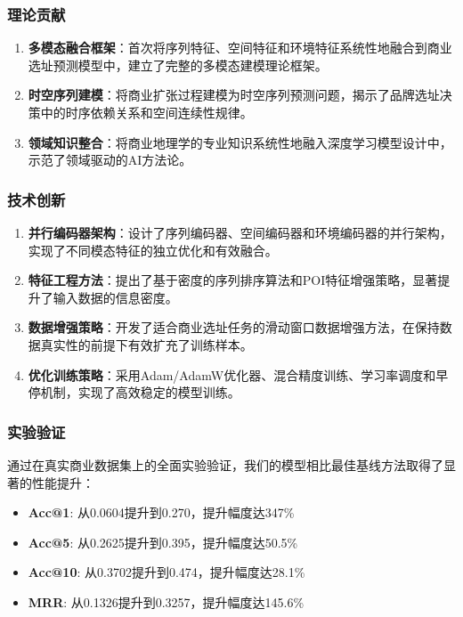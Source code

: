 \documentclass{article}
\begin{document}
\subsubsection{理论贡献}

\begin{enumerate}
\item \textbf{多模态融合框架}：首次将序列特征、空间特征和环境特征系统性地融合到商业选址预测模型中，建立了完整的多模态建模理论框架。
\item \textbf{时空序列建模}：将商业扩张过程建模为时空序列预测问题，揭示了品牌选址决策中的时序依赖关系和空间连续性规律。
\item \textbf{领域知识整合}：将商业地理学的专业知识系统性地融入深度学习模型设计中，示范了领域驱动的AI方法论。
\end{enumerate}

\subsubsection{技术创新}

\begin{enumerate}
\item \textbf{并行编码器架构}：设计了序列编码器、空间编码器和环境编码器的并行架构，实现了不同模态特征的独立优化和有效融合。
\item \textbf{特征工程方法}：提出了基于密度的序列排序算法和POI特征增强策略，显著提升了输入数据的信息密度。
\item \textbf{数据增强策略}：开发了适合商业选址任务的滑动窗口数据增强方法，在保持数据真实性的前提下有效扩充了训练样本。
\item \textbf{优化训练策略}：采用Adam/AdamW优化器、混合精度训练、学习率调度和早停机制，实现了高效稳定的模型训练。
\end{enumerate}

\subsubsection{实验验证}

通过在真实商业数据集上的全面实验验证，我们的模型相比最佳基线方法取得了显著的性能提升：

\begin{itemize}
\item \textbf{Acc@1}: 从0.0604提升到0.270，提升幅度达347\%
\item \textbf{Acc@5}: 从0.2625提升到0.395，提升幅度达50.5\%
\item \textbf{Acc@10}: 从0.3702提升到0.474，提升幅度达28.1\%
\item \textbf{MRR}: 从0.1326提升到0.3257，提升幅度达145.6\%
\end{itemize}
\end{document}
